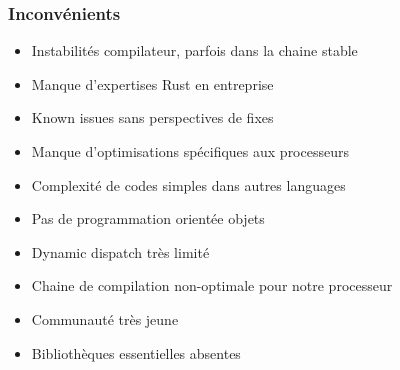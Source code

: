         \subsubsection{Inconvénients}
            \begin{itemize}
                \renewcommand{\labelitemi}{$\bullet$}
                \item Instabilités compilateur, parfois dans la chaine stable
                \item Manque d'expertises Rust en entreprise
                \item Known issues sans perspectives de fixes
                \item Manque d'optimisations spécifiques aux processeurs
                \item Complexité de codes simples dans autres languages
                \item Pas de programmation orientée objets
                \item Dynamic dispatch très limité
                \item Chaine de compilation non-optimale pour notre processeur
                \item Communauté très jeune
                \item Bibliothèques essentielles absentes
            \end{itemize}

